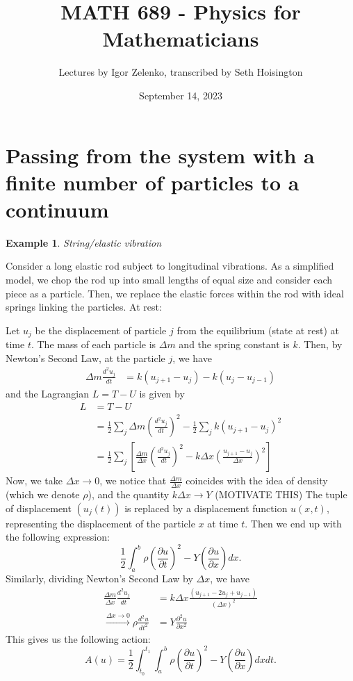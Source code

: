 \documentclass{article}
\title{MATH 689 - Physics for Mathematicians}
\author{Lectures by Igor Zelenko, transcribed by Seth Hoisington}
\date{September 14, 2023}
\newcommand{\nl}{\newline\newline\noindent}
\newcommand{\pdof}[2]{\frac{\partial #1}{\partial #2}}
\newtheorem{ex}{Example}
\begin{document}
\maketitle
\section{Passing from the system with a finite number of particles to a continuum}

\begin{ex}
    String/elastic vibration
\end{ex}
Consider a long elastic rod subject to longitudinal vibrations. As a simplified model, we chop the rod up into small lengths of equal size and consider each piece as a particle. Then, we replace the elastic forces within the rod with ideal springs linking the particles. At rest:


Let $u_j$ be the displacement of particle $j$ from the equilibrium (state at rest) at time $t$. The mass of each particle is $\Delta m$ and the spring constant is $k$. Then, by Newton's Second Law, at the particle $j$, we have
\begin{align*}
    \Delta m \frac{d^2u_j}{dt}&= k(u_{j+1} - u_j) - k(u_j-u_{j-1})
\end{align*}
and the Lagrangian $L=T-U$ is given by
\begin{align*}
    L&=T-U\\
    &=\frac{1}{2}\sum_j \Delta m \left(\frac{d^2u_j}{dt}\right)^2 - \frac{1}{2}\sum_j k (u_{j+1} - u_j)^2\\
    &=\frac{1}{2}\sum_j \left[\frac{\Delta m}{\Delta x}\left(\frac{d^2u_j}{dt}\right)^2 - k\Delta x\left(\frac{u_{j+1} - u_j}{\Delta x}\right)^2\right]
\end{align*}
Now, we take $\Delta x \to 0$, we notice that $\frac{\Delta m}{\Delta x}$ coincides with the idea of density (which we denote $\rho$), and the quantity $k\Delta x\to Y$ (MOTIVATE THIS)
\nl
The tuple of displacement $(u_j(t))$ is replaced by a displacement function $u(x,t)$, representing the displacement of the particle $x$ at time $t$. Then we end up with the following expression:
\[\frac{1}{2}\int_a^b \rho\left(\pdof{u}{t}\right)^2 - Y\left(\pdof{u}{x}\right) dx.\]
Similarly, dividing Newton's Second Law by $\Delta x$, we have
\begin{align*}
    \frac{\Delta m}{\Delta x} \frac{d^2u_j}{dt}&= k\Delta x\frac{(u_{j+1}  -2u_j+u_{j-1})}{(\Delta x)^2}\\
    \overset{\Delta x\to 0}{\longrightarrow} \rho \frac{d^2u}{dt^2} &= Y\frac{\partial^2 u}{\partial x^2}
\end{align*}
This gives us the following action:
\[A(u) = \frac{1}{2}\int_{t_0}^{t_1}\int_a^b \rho\left(\pdof{u}{t}\right)^2 - Y\left(\pdof{u}{x}\right) dxdt.\]
\end{document}
